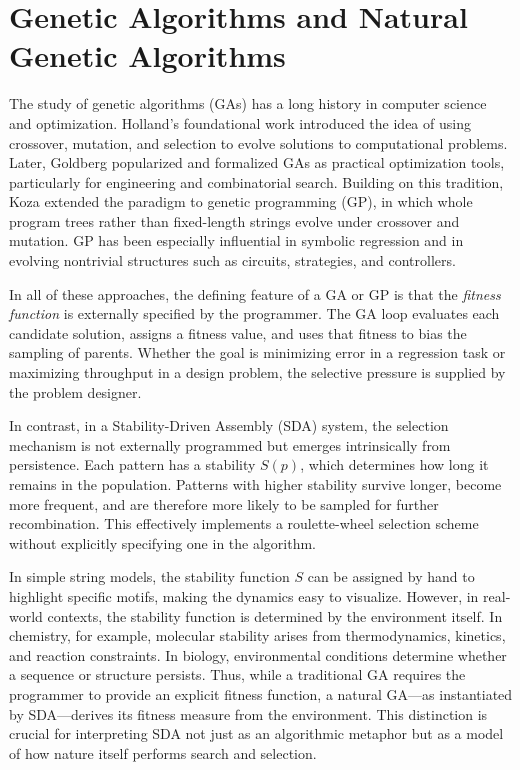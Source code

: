 \documentclass[life,article,submit,pdftex,moreauthors]{Definitions/mdpi}
\begin{document}
\section{Genetic Algorithms and Natural Genetic Algorithms}

The study of genetic algorithms (GAs) has a long history in computer science and optimization. 
Holland’s foundational work \cite{holland1975adaptation} introduced the idea of using crossover, 
mutation, and selection to evolve solutions to computational problems. Later, Goldberg 
\cite{goldberg1989genetic} popularized and formalized GAs as practical optimization tools, 
particularly for engineering and combinatorial search. Building on this tradition, Koza 
\cite{koza1992genetic} extended the paradigm to genetic programming (GP), in which whole 
program trees rather than fixed-length strings evolve under crossover and mutation. GP has 
been especially influential in symbolic regression and in evolving nontrivial structures such 
as circuits, strategies, and controllers.

In all of these approaches, the defining feature of a GA or GP is that the \emph{fitness function} 
is externally specified by the programmer. The GA loop evaluates each candidate solution, assigns 
a fitness value, and uses that fitness to bias the sampling of parents. Whether the goal is 
minimizing error in a regression task or maximizing throughput in a design problem, the selective 
pressure is supplied by the problem designer.


In contrast, in a Stability-Driven Assembly (SDA) system, the selection mechanism is not externally
programmed but emerges intrinsically from persistence. Each pattern has a stability $S(p)$, 
which determines how long it remains in the population. Patterns with higher stability survive
longer, become more frequent, and are therefore more likely to be sampled for further
recombination. This effectively implements a roulette-wheel selection scheme without explicitly specifying one in the algorithm.

In simple string models, the stability function $S$ can be assigned by hand to highlight specific motifs, making the dynamics easy to visualize. However, in real-world contexts, the stability
function is determined by the environment itself. In chemistry, for example, molecular stability 
arises from thermodynamics, kinetics, and reaction constraints. In biology, environmental conditions 
determine whether a sequence or structure persists. Thus, while a traditional GA requires the 
programmer to provide an explicit fitness function, a natural GA---as instantiated by SDA---derives 
its fitness measure from the environment. This distinction is crucial for interpreting SDA not just as an algorithmic metaphor but as a model of how nature itself performs search and selection.
\end{document}
